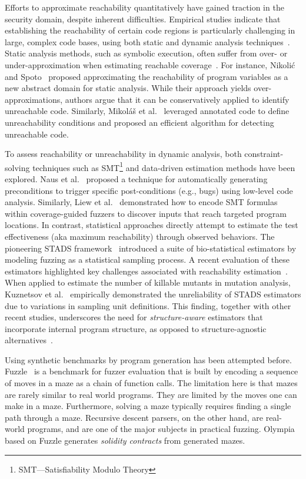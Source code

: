 \documentclass[conference,anonymous,review]{IEEEtran}
\begin{document}
Efforts to approximate reachability quantitatively have gained traction in the security domain, despite inherent difficulties. Empirical studies indicate that establishing the reachability of certain code regions is particularly challenging in large, complex code bases, using both static and dynamic analysis techniques~\cite{latoza2010developers}. Static analysis methods, such as symbolic execution, often suffer from over- or under-approximation when estimating reachable coverage~\cite{liyanage2023reachable,aniche2015why}. For instance, Nikoli\'{c} and Spoto~\cite{nikolic2013reachability} proposed approximating the reachability of program variables as a new abstract domain for static analysis. While their approach yields over-approximations, authors argue that it can be conservatively applied to identify unreachable code. Similarly, Mikol\'{a}\v{s} et al.~\cite{janota2007reachability} leveraged annotated code to define unreachability conditions and proposed an efficient algorithm for detecting unreachable code.

To assess reachability or unreachability in dynamic analysis, both constraint-solving techniques such as SMT\footnote{SMT—Satisfiability Modulo Theory} and data-driven estimation methods have been explored. Naus et al.~\cite{naus2023low} proposed a technique for automatically generating preconditions to trigger specific post-conditions (e.g., bugs) using low-level code analysis. Similarly, Liew et al.~\cite{liew2019just} demonstrated how to encode SMT formulas within coverage-guided fuzzers to discover inputs that reach targeted program locations. In contrast, statistical approaches directly attempt to estimate the test effectiveness (aka maximum reachability) through observed behaviors. The pioneering STADS framework~\cite{boehme2018stads} introduced a suite of bio-statistical estimators by modeling fuzzing as a statistical sampling process. A recent evaluation of these estimators highlighted key challenges associated with reachability estimation~\cite{liyanage2023reachable}. When applied to estimate the number of killable mutants in mutation analysis, Kuznetsov et al.~\cite{Kuznetsov2024empirical} empirically demonstrated the unreliability of STADS estimators due to variations in sampling unit definitions. This finding, together with other recent studies, underscores the need for \emph{structure-aware} estimators that incorporate internal program structure, as opposed to structure-agnostic alternatives~\cite{lee2023statistical}.

Using synthetic benchmarks by program generation has been attempted before.
Fuzzle~\cite{lee2022fuzzle} is a benchmark for fuzzer evaluation that is built
by encoding a sequence of moves in a maze as a chain of function calls. The
limitation here is that mazes are rarely similar to real world programs.
They are limited by the moves one can make in a maze. Furthermore, solving
a maze typically requires finding a single path through a maze.
Recursive descent parsers, on the other hand, are real-world programs, and
are one of the major subjects in practical fuzzing.
Olympia~\cite{chadt2024olympia} based on Fuzzle generates \emph{solidity contracts} from generated mazes.
\end{document}
